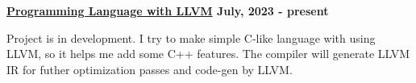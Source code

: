 \textbf{\href{https://github.com/jirol9xa/E6-lang} {Programming Language with LLVM} \hfill  July, 2023 - present} \par
\begin{itemize}
Project is in development. I try to make simple C-like language with using LLVM, so it helps me add some C++ features. The compiler will generate LLVM IR for futher optimization passes and code-gen by LLVM.
\end{itemize} \par